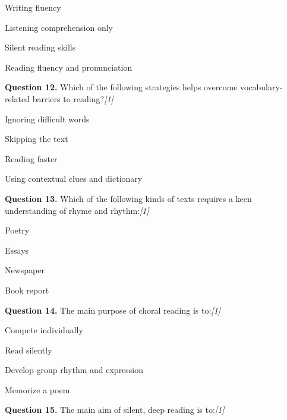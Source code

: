 \documentclass[11pt,a4paper]{article}
\newcommand{\pts}[1]{\hfill \textit{[#1]}}
\begin{document}
\begin{parts}
  \item Writing fluency
  \item Listening comprehension only
  \item Silent reading skills
  \item Reading fluency and pronunciation
\end{parts}

\medskip




\noindent \textbf{Question 12.} Which of the following strategies helps overcome vocabulary-related barriers to reading?\pts{1}

\begin{parts}
  \item Ignoring difficult words
  \item Skipping the text
  \item Reading faster
  \item Using contextual clues and dictionary
\end{parts}

\medskip




\noindent \textbf{Question 13.} Which of the following kinds of texts requires a keen understanding of rhyme and rhythm:\pts{1}

\begin{parts}
  \item Poetry
  \item Essays
  \item Newspaper
  \item Book report
\end{parts}

\medskip




\noindent \textbf{Question 14.} The main purpose of choral reading is to:\pts{1}

\begin{parts}
  \item Compete individually
  \item Read silently
  \item Develop group rhythm and expression
  \item Memorize a poem
\end{parts}

\medskip




\noindent \textbf{Question 15.} The main aim of silent, deep reading is to:\pts{1}
\end{document}
